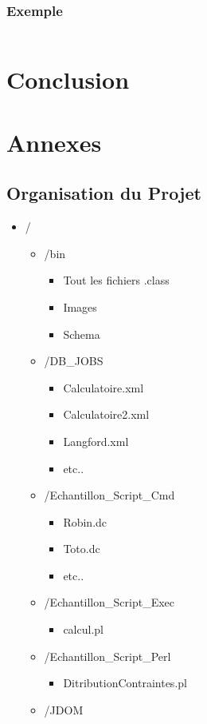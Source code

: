 \documentclass[11pt]{report}
\begin{document}
\subsection{Exemple}
\inputminted{perl}{../Echantillon_Script_build/build.pl}
\chapter{Conclusion}


\chapter{Annexes}
\section{Organisation du Projet}
\begin{itemize}
\item / \begin{itemize}
		\item /bin  \begin{itemize} \item Tout les fichiers .class \item Images \item Schema    \end{itemize}
		\item /DB\_JOBS \begin{itemize} \item Calculatoire.xml \item Calculatoire2.xml \item Langford.xml \item etc.. \end{itemize}
		\item /Echantillon\_Script\_Cmd \begin{itemize} \item Robin.dc \item Toto.dc \item etc..\end{itemize}
		\item /Echantillon\_Script\_Exec \begin{itemize}\item calcul.pl  \end{itemize}
		\item /Echantillon\_Script\_Perl \begin{itemize}\item  DitributionContraintes.pl \end{itemize}
		\item /JDOM  

\end{itemize}
\end{itemize}
\end{document}
